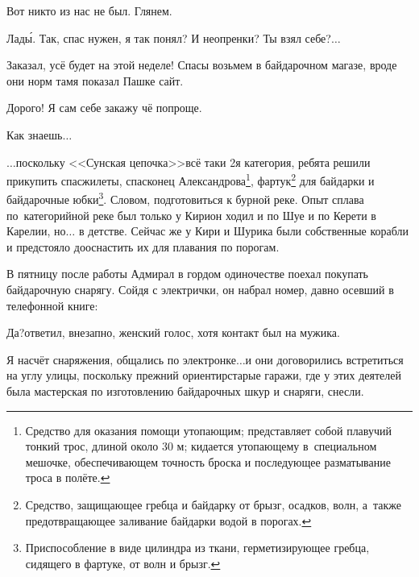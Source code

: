 \diagdash Вот никто из нас не был. Глянем.

\diagdash Лад\'{ы}. Так, спас нужен, я так понял? И неопренки? Ты взял себе?$\ldots$

\diagdash Заказал, усё будет на этой неделе! Спасы возьмем в байдарочном магазе, вроде они норм там\mdash я показал Пашке сайт.

\diagdash Дорого! Я сам себе закажу чё попроще.

\diagdash Как знаешь$\ldots$


\newpage
\renewcommand*{\thefootnote}{\arabic{footnote}}
$\ldots$поскольку <<Сунская цепочка>>\mdash всё таки 2\sdash я категория, ребята решили прикупить спасжилеты, спасконец Александрова\footnote[1]{Средство для оказания помощи утопающим; представляет собой плавучий тонкий трос, длиной около 30 м; кидается утопающему в~специальном мешочке, обеспечивающем точность броска и последующее разматывание троса в полёте.}, фартук\footnote[2]{Средство, защищающее гребца и байдарку от брызг, осадков, волн, а~также предотвращающее заливание байдарки водой в порогах.} для байдарки и байдарочные юбки\footnote[3]{Приспособление в виде цилиндра из ткани, герметизирующее гребца, сидящего в фартуке, от волн и брызг.}. Словом, подготовиться к бурной реке. Опыт сплава по~категорийной реке был только у Кири\mdash он ходил и по Шуе и по Керети в Карелии, но$\ldots$ в детстве. Сейчас же у Кири и Шурика были собственные корабли и предстояло дооснастить их для плавания по порогам. 

В пятницу после работы Адмирал в гордом одиночестве поехал покупать байдарочную снарягу. Сойдя с электрички, он набрал номер, давно осевший в телефонной книге:

\diagdash Да?\mdash ответил, внезапно, женский голос, хотя контакт был на мужика.

\diagdash Я насчёт снаряжения, общались по электронке$\ldots$\mdash и они договорились встретиться на углу улицы, поскольку прежний ориентир\mdash старые гаражи, где у этих деятелей была мастерская по изготовлению байдарочных шкур и снаряги, снесли.

